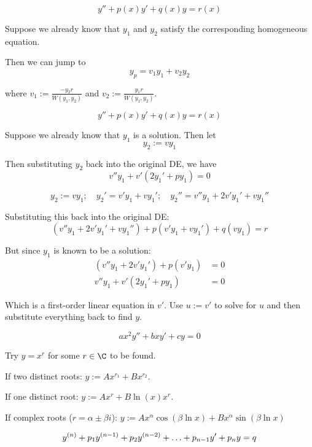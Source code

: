 $$y''+p(x)y'+q(x)y=r(x)$$

Suppose we already know that $y_1$ and $y_2$ satisfy the corresponding
homogeneous equation.

Then we can jump to
$$y_p=v_1y_1+v_2y_2$$

where $\displaystyle v_1:=\frac{-y_2r}{W(y_1,y_2)}$ and $\displaystyle
v_2:=\frac{y_1r}{W(y_1,y_2)}$.

\label{d359b97}

$$y''+p(x)y'+q(x)y=r(x)$$

Suppose we already know that $y_1$ is a solution. Then let
$$y_2:=vy_1$$

Then substituting $y_2$ back into the original DE, we have
$$v''y_1+v'(2y_1'+py_1)=0$$

\begin{compute}
  $$y_2:=vy_1;\quad y_2'=v'y_1+vy_1';\quad y_2''=v''y_1+2v'y_1'+vy_1''$$

  Substituting this back into the original DE:
  $$(v''y_1+2v'y_1'+vy_1'')+p(v'y_1+vy_1')+q(vy_1)=r$$

  But since $y_1$ is known to be a solution:
  \begin{align*}
    (v''y_1+2v'y_1')+p(v'y_1) &=0 \\
    v''y_1+v'(2y_1'+py_1)     &=0
  \end{align*}
\end{compute}

Which is a first-order linear equation in $v'$. Use $u:=v'$ to solve for $u$
and then substitute everything back to find $y$.

\label{c15a777}

$$ax^2y''+bxy'+cy=0$$

Try $y=x^r$ for some $r\in\C$ to be found.

If two distinct roots: $y:=Ax^{r_1}+Bx^{r_2}$.

If one distinct root: $y:=Ax^r+B\ln(x)x^r$.

If complex roots ($r=\alpha\pm\beta i$): $y:=Ax^\alpha\cos(\beta\ln
x)+Bx^\alpha\sin(\beta\ln x)$



\begin{equation*}\def\y#1{y^{(#1)}}
  \y n+p_1\y{n-1}+p_2\y{n-2}+\ldots+p_{n-1}y'+p_ n y=q
\end{equation*}


